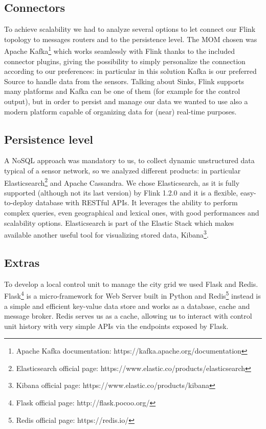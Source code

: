 \subsection{Connectors}
To achieve scalability we had to analyze several options to let connect our Flink topology to messages routers and to the persistence level. The MOM chosen was Apache Kafka\footnote{Apache Kafka documentation: https://kafka.apache.org/documentation} which works seamlessly with Flink thanks to the included connector plugins, giving the possibility to simply personalize the connection according to our preferences: in particular in this solution Kafka is our preferred Source to handle data from the sensors. Talking about Sinks, Flink supports many platforms and Kafka can be one of them (for example for the control output), but in order to persist and manage our data we wanted to use also a modern platform capable of organizing data for (near) real-time purposes.

\subsection{Persistence level}
A NoSQL approach was mandatory to us, to collect dynamic unstructured data typical of a sensor network, so we analyzed different products: in particular Elasticsearch\footnote{Elasticsearch official page: https://www.elastic.co/products/elasticsearch} and Apache Cassandra. We chose Elasticsearch, as it is fully supported (although not its last version) by Flink 1.2.0 and it is a flexible, easy-to-deploy database with RESTful APIs. It leverages the ability to perform complex queries, even geographical and lexical ones, with good performances and scalability options. Elasticsearch is part of the Elastic Stack which makes available another useful tool for visualizing stored data, Kibana\footnote{Kibana official page: https://www.elastic.co/products/kibana}.

\subsection{Extras}
To develop a local control unit to manage the city grid we used Flask and Redis. Flask\footnote{Flask official page: http://flask.pocoo.org/} is a micro-framework for Web Server built in Python and Redis\footnote{Redis official page: https://redis.io/} instead is a simple and efficient key-value data store and works as a database, cache and message broker. Redis serves us as a cache, allowing us to interact with control unit history with very simple APIs via the endpoints exposed by Flask.

